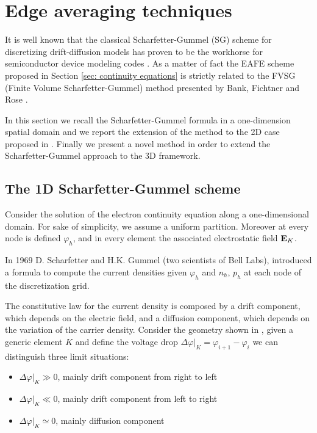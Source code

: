 %
%
%
%

 
 
\section{Edge averaging techniques} 
 
It is well known that the classical Scharfetter-Gummel (SG) scheme for discretizing drift-diffusion models has proven to be the workhorse for semiconductor device modeling codes \cite{Gummel:SignAnalys}. As a matter of fact the EAFE scheme proposed in Section \ref{sec: continuity equations} is strictly related to the FVSG (Finite Volume Scharfetter-Gummel) method presented by Bank, Fichtner and Rose \cite{Bank:FVSG}. 

In this section we recall the Scharfetter-Gummel formula in a one-dimension spatial domain and we report the extension of the method to the 2D case proposed in \cite{Bank:FEvsBOX}. Finally we present a novel method in order to extend the Scharfetter-Gummel approach to the 3D framework.

\subsection{The 1D Scharfetter-Gummel scheme}

Consider the solution of the electron continuity equation along a one-dimensional domain. For sake of simplicity, we assume a uniform partition. Moreover at every node is defined $\varphi_h$, and in every element the associated electrostatic field $\mathbf{E}_K$.

 In 1969 D. Scharfetter and H.K. Gummel (two scientists of Bell Labs), introduced a formula to compute the current densities given $\varphi_h$ and $n_h$, $p_h$ at each node of the discretization grid. 
 
The constitutive law for the current density is composed by a drift component, which depends on the electric field, and a diffusion component, which depends on the variation of the carrier density. Consider the geometry shown in , given a generic element $K$ and define the voltage drop $\Delta \varphi|_K=\varphi_{i+1}-\varphi_{i}$ we can distinguish three limit situations: 
\begin{itemize}
\item $\Delta \varphi|_K \gg0$, mainly drift component from right to left 
\item $\Delta \varphi|_K \ll0$, mainly drift component from left to right
\item $\Delta \varphi|_K \simeq 0$, mainly diffusion component
\end{itemize} 
 

